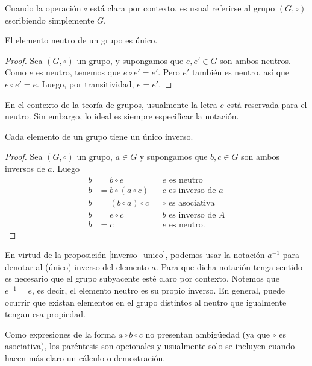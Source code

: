 Cuando la operación $\circ$ está clara por contexto, es usual referirse al grupo $(G, \circ)$ escribiendo simplemente $G$. 

\begin{proposition}
El elemento neutro de un grupo es único.
\end{proposition}

\begin{proof}
Sea $(G,\circ)$ un grupo, y supongamos que $e, e' \in G$ son ambos neutros. Como $e$ es neutro, tenemos que $e \circ e' = e'$. Pero $e'$ también es neutro, así que $e \circ e' = e$. Luego, por transitividad, $e = e'$.
\end{proof}

En el contexto de la teoría de grupos, usualmente la letra $e$ está reservada para el neutro. Sin embargo, lo ideal es siempre especificar la notación. 

\begin{proposition} \label{inverso_unico}
	Cada elemento de un grupo tiene un único inverso.
	\end{proposition}
	
	\begin{proof}
	Sea $(G,\circ)$ un grupo, $a \in G$ y supongamos que $b, c \in G$ son ambos inversos de $a$. Luego
	\begin{align*}
	b &= b \circ e && e \text{ es neutro} \\
	b &= b \circ \left( a \circ c \right) && c \text{ es inverso de } a \\
	b &= \left( b \circ a \right) \circ c && \text{$\circ$} \text{ es asociativa} \\
	b &= e \circ c && b \text{ es inverso de } A \\
	b &= c && e \text{ es neutro}.
	\end{align*}
	\end{proof}

En virtud de la proposición \ref{inverso_unico}, podemos usar la notación $a^{-1}$ para denotar al (único) inverso del elemento $a$. Para que dicha notación tenga sentido es necesario que el grupo subyacente esté claro por contexto. 
Notemos que $e^{-1} = e$, es decir, el elemento neutro es su propio inverso. En general, puede ocurrir que existan elementos en el grupo distintos al neutro que igualmente tengan esa propiedad.

Como expresiones de la forma $a \circ b \circ c$ no presentan ambigüedad (ya que $\circ$ es asociativa), los paréntesis son opcionales y usualmente solo se incluyen cuando hacen más claro un cálculo o demostración.

